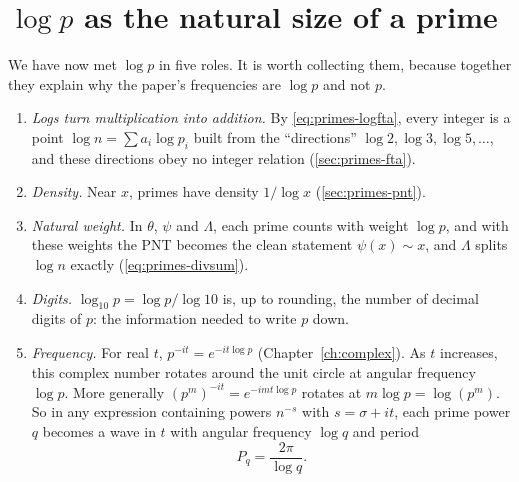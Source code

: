 \section{$\log p$ as the natural size of a prime}\label{sec:primes-logp}

We have now met $\log p$ in five roles. It is worth collecting them, because together they explain why the paper's frequencies are $\log p$ and not $p$.
\begin{enumerate}
\item \emph{Logs turn multiplication into addition.} By \cref{eq:primes-logfta}, every integer is a point $\log n=\sum a_i\log p_i$ built from the ``directions'' $\log2,\log3,\log5,\dots$, and these directions obey no integer relation (\cref{sec:primes-fta}).
\item \emph{Density.} Near $x$, primes have density $1/\log x$ (\cref{sec:primes-pnt}).
\item \emph{Natural weight.} In $\theta$, $\psi$ and $\Lambda$, each prime counts with weight $\log p$, and with these weights the PNT becomes the clean statement $\psi(x)\sim x$, and $\Lambda$ splits $\log n$ exactly (\cref{eq:primes-divsum}).
\item \emph{Digits.} $\log_{10}p=\log p/\log10$ is, up to rounding, the number of decimal digits of $p$: the information needed to write $p$ down.
\item \emph{Frequency.} For real $t$, $p^{-it}=e^{-it\log p}$ (Chapter~\ref{ch:complex}). As $t$ increases, this complex number rotates around the unit circle at angular frequency $\log p$. More generally $(p^m)^{-it}=e^{-imt\log p}$ rotates at $m\log p=\log(p^m)$. So in any expression containing powers $n^{-s}$ with $s=\sigma+it$, each prime power $q$ becomes a wave in $t$ with angular frequency $\log q$ and period
\begin{equation}
P_q=\frac{2\pi}{\log q}.
\label{eq:primes-period}
\end{equation}
\end{enumerate}

